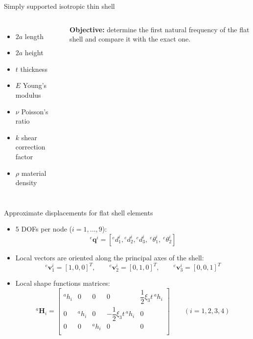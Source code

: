 \documentclass[aspectratio=169]{beamer}
\begin{document}
\begin{frame}{Simply supported isotropic thin shell}
\begin{columns}
    {\begin{itemize}\setlength\itemsep{0.05em}
        \item $2a$ length
        \item $2a$ height
        \item $t$ thickness
        \item $E$ Young's modulus
        \item $\nu$ Poisson's ratio
        \item $k$ shear correction factor
        \item $\rho$ material density
      \end{itemize}}
    \begin{block}{}
      \textbf{Objective:} determine the first natural frequency of the flat shell and compare it with the exact one.
    \end{block}
  \end{columns}
\end{frame}

\begin{frame}{Approximate displacements for flat shell elements}
  \begin{itemize}
    \item 5 DOFs per node ($i=1,\dots,9$): $${}^e{\mathbf q}^i=[{}^e{d}^i_1, {}^e{d}^i_2, {}^e{d}^i_3,\ {}^e{\theta}^i_1,\ {}^e{\theta}^i_2]$$
    \item Local vectors are oriented along the principal axes of the shell:
          $$ {}^e\mathbf v^i_1=[1,0,0]^T,  \qquad {}^e\mathbf v^i_2=[0,1,0]^T, \qquad {}^e\mathbf v^i_3=[0,0,1]^T$$
    \item Local shape functions matrices:
          $${}^a\mathbf H_i=
            \begin{bmatrix}
              {}^a h_i & 0        & 0        & 0                                & \dfrac{1}{2}\xi_3 t \, {}^a h_i \\
              0        & {}^a h_i & 0        & -\dfrac{1}{2}\xi_3 t \, {}^a h_i & 0                               \\
              0        & 0        & {}^a h_i & 0                                & 0                               \\
            \end{bmatrix}\qquad (i = 1, 2, 3, 4)
          $$
  \end{itemize}
\end{frame}
\end{document}
